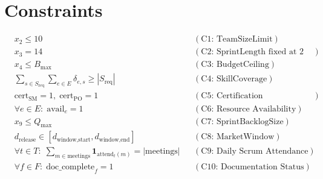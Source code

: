 \documentclass{article}
\begin{document}
\section*{Constraints}
\[
\begin{aligned}
&x_2 \le 10 &&(\text{C1: TeamSizeLimit})\\
&x_3 = 14 &&(\text{C2: SprintLength fixed at 2 weeks})\\
&x_4 \le B_{\text{max}} &&(\text{C3: BudgetCeiling})\\
&\sum_{s \in S_{\text{req}}} \sum_{e \in E} \delta_{e,s} \ge |S_{\text{req}}| &&(\text{C4: SkillCoverage})\\
&\text{cert}_{\text{SM}} = 1,\;\text{cert}_{\text{PO}} = 1 &&(\text{C5: Certification Requirement})\\
&\forall e\in E:\; \text{avail}_e = 1 &&(\text{C6: Resource Availability})\\
&x_9 \le Q_{\text{max}} &&(\text{C7: SprintBacklogSize})\\
&d_{\text{release}} \in [d_{\text{window,start}},d_{\text{window,end}}] &&(\text{C8: MarketWindow})\\
&\forall t\in T:\; \sum_{m \in \text{meetings}} \mathbf{1}_{\text{attend}_t(m)} = | \text{meetings}| &&(\text{C9: Daily Scrum Attendance})\\
&\forall f\in F:\; \text{doc\_complete}_f = 1 &&(\text{C10: Documentation Status})
\end{aligned}
\]
\end{document}
